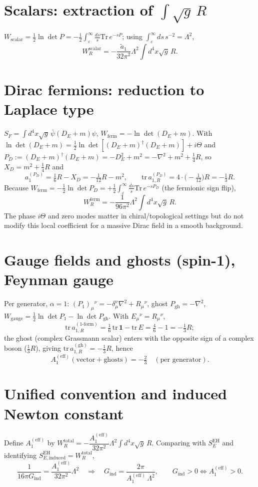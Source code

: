 \documentclass[11pt,a4paper]{article}
\newcommand{\Aeff}{A_1^{(\mathrm{eff})}}
\begin{document}
\section{Scalars: extraction of $\int\sqrt{g}\,R$}
$W_{\mathrm{scalar}} = \tfrac12\ln\det P = -\tfrac12\int_\varepsilon^\infty
\tfrac{ds}{s}\mathrm{Tr}\,e^{-sP}$; using $\int_\varepsilon^\infty ds\,s^{-2}
= \Lambda^2$,
\[
W_R^{\mathrm{scalar}} = -\frac{\tilde a_1}{32\pi^2}\Lambda^2
\int d^4x\sqrt{g}\,R.
\]

\section{Dirac fermions: reduction to Laplace type}
$S_F = \int d^4x\sqrt{g}\,\bar\psi(D_E + m)\psi$, $W_{\mathrm{ferm}} =
-\ln\det(D_E + m)$. With $\ln\det(D_E+m) = \tfrac12\ln\det[(D_E+m)^\dagger
(D_E+m)] + i\Theta$ and $P_D := (D_E+m)^\dagger(D_E+m) = -D_E^2 + m^2 =
-\nabla^2 + m^2 + \tfrac14 R$, so $X_D = m^2 + \tfrac14 R$ and
\[
a_1^{(P_D)} = \tfrac16 R - X_D = -\tfrac{1}{12}R - m^2,
\qquad
\mathrm{tr}\,a_{1,R}^{(P_D)} = 4\cdot\big(-\tfrac{1}{12}\big)R = -\tfrac13 R.
\]
Because $W_{\mathrm{ferm}} = -\tfrac12\ln\det P_D = +\tfrac12
\int_\varepsilon^\infty\tfrac{ds}{s}\mathrm{Tr}\,e^{-sP_D}$ (the fermionic
sign flip),
\[
W_R^{\mathrm{ferm}} = -\frac{1}{96\pi^2}\Lambda^2\int d^4x\sqrt{g}\,R.
\]
The phase $i\Theta$ and zero modes matter in chiral/topological settings but do
not modify this local coefficient for a massive Dirac field in a smooth
background.

\section{Gauge fields and ghosts (spin-1), Feynman gauge}
Per generator, $\alpha=1$: $(P_1)_\mu{}^\nu = -\delta_\mu^\nu\nabla^2 +
R_\mu{}^\nu$, ghost $P_{\mathrm{gh}} = -\nabla^2$,
$W_{\mathrm{gauge}} = \tfrac12\ln\det P_1 - \ln\det P_{\mathrm{gh}}$. With
$E_\mu{}^\nu = R_\mu{}^\nu$,
\[
\mathrm{tr}\,a_{1,R}^{(1\text{-form})} = \tfrac16\,\mathrm{tr}\,\mathbf 1
- \mathrm{tr}\,E = \tfrac46 - 1 = -\tfrac13 R;
\]
the ghost (complex Grassmann scalar) enters with the opposite sign of a
complex boson ($\tfrac13 R$), giving $\mathrm{tr}\,a_{1,R}^{(\mathrm{gh})} =
-\tfrac13 R$, hence
\[
\Aeff(\text{vector}+\text{ghosts}) = -\tfrac23 \quad(\text{per generator}).
\]

\section{Unified convention and induced Newton constant}
Define $\Aeff$ by $W_R^{\mathrm{total}} = -\dfrac{\Aeff}{32\pi^2}\Lambda^2
\int d^4x\sqrt{g}\,R$. Comparing with $S_E^{\mathrm{EH}}$ and identifying
$S_{E,\mathrm{induced}}^{\mathrm{EH}} = W_R^{\mathrm{total}}$,
\[
\frac{1}{16\pi G_{\mathrm{ind}}} = \frac{\Aeff}{32\pi^2}\Lambda^2
\quad\Longrightarrow\quad
G_{\mathrm{ind}} = \frac{2\pi}{\Aeff\,\Lambda^2},
\qquad
G_{\mathrm{ind}} > 0 \iff \Aeff > 0.
\]
\end{document}
